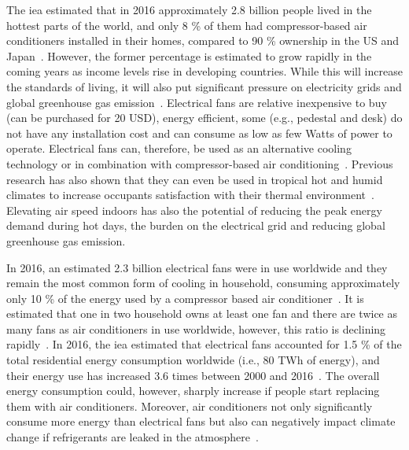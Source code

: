 The \ac{iea} estimated that in 2016 approximately 2.8 billion people lived in the hottest parts of the world, and only 8 \% of them had compressor-based air conditioners installed in their homes, compared to 90 \% ownership in the US and Japan~\cite{IEA2018}.
However, the former percentage is estimated to grow rapidly in the coming years as income levels rise in developing countries.
While this will increase the standards of living, it will also put significant pressure on electricity grids and global greenhouse gas emission~\cite{IEA2018}.
Electrical fans are relative inexpensive to buy (can be purchased for 20 USD), energy efficient, some (e.g., pedestal and desk) do not have any installation cost and can consume as low as few Watts of power to operate.
Electrical fans can, therefore, be used as an alternative cooling technology or in combination with compressor-based air conditioning~\cite{Jay2019a, Yang2015a}.
Previous research has also shown that they can even be used in tropical hot and humid climates to increase occupants satisfaction with their thermal environment~\cite{Lipczynska2018a}.
Elevating air speed indoors has also the potential of reducing the peak energy demand during hot days, the burden on the electrical grid and reducing global greenhouse gas emission.

In 2016, an estimated 2.3 billion electrical fans were in use worldwide and they remain the most common form of cooling in household, consuming approximately only 10 \% of the energy used by a compressor based air conditioner~\cite{IEA2018}.
It is estimated that one in two household owns at least one fan and there are twice as many fans as air conditioners in use worldwide, however, this ratio is declining rapidly~\cite{IEA2018}.
In 2016, the \ac{iea} estimated that electrical fans accounted for 1.5 \% of the total residential energy consumption worldwide (i.e., 80 TWh of energy), and their energy use has increased 3.6 times between 2000 and 2016~\cite{IEA2018}.
The overall energy consumption could, however, sharply increase if people start replacing them with air conditioners.
Moreover, air conditioners not only significantly consume more energy than electrical fans but also can negatively impact climate change if refrigerants are leaked in the atmosphere~\cite{IEA2018}.

